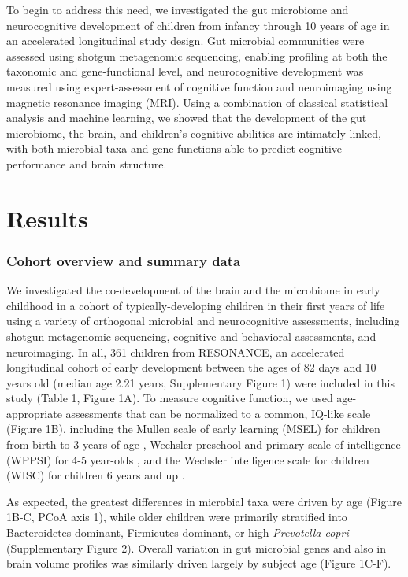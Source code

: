 \documentclass[a4paper]{article}
\begin{document}
To begin to address this need, we investigated the gut microbiome and
neurocognitive development of children from infancy through 10 years of
age in an accelerated longitudinal study design. Gut microbial
communities were assessed using shotgun metagenomic sequencing, enabling
profiling at both the taxonomic and gene-functional level, and
neurocognitive development was measured using expert-assessment of
cognitive function and neuroimaging using magnetic resonance imaging
(MRI). Using a combination of classical statistical analysis and machine
learning, we showed that the development of the gut microbiome, the
brain, and children's cognitive abilities are intimately linked, with
both microbial taxa and gene functions able to predict cognitive
performance and brain structure.

\section*{Results}

\subsubsection{Cohort overview and summary data}

We investigated the co-development of the brain and the microbiome in
early childhood in a cohort of typically-developing children in their
first years of life using a variety of orthogonal microbial and
neurocognitive assessments, including shotgun metagenomic sequencing,
cognitive and behavioral assessments, and neuroimaging. In all, 361
children from RESONANCE,
an accelerated longitudinal cohort of early development
\cite{forrestAdvancingScienceChildren2018}
between the ages of 82 days and 10 years
old (median age 2.21 years, Supplementary Figure 1) were included in
this study (Table 1, Figure 1A). To measure cognitive function, we used
age-appropriate assessments that can be normalized to a common, IQ-like
scale (Figure 1B), including the Mullen scale of early learning (MSEL)
for children from birth to 3 years of age
\cite{mullenMullenScalesEarly1995},
Wechsler preschool and primary scale of intelligence (WPPSI)
for 4-5 year-olds
\cite{wechslerWechslerPreschoolPrimary2012},
and the Wechsler intelligence scale for children (WISC)
for children 6 years and up
\cite{wechslerWechslerIntelligenceScale1949}.

As expected, the greatest differences in microbial taxa were driven by
age (Figure 1B-C, PCoA axis 1), while older children were primarily
stratified into Bacteroidetes-dominant, Firmicutes-dominant, or
high-\emph{Prevotella copri} (Supplementary Figure 2). Overall variation
in gut microbial genes and also in brain volume profiles was similarly
driven largely by subject age (Figure 1C-F).
\end{document}
